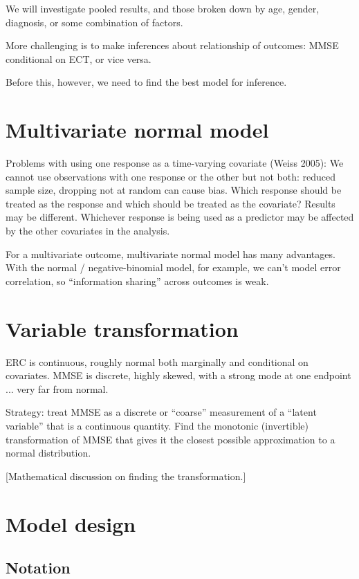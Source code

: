 \documentclass[12pt]{article}
\begin{document}
We will investigate pooled results, and those broken down by age, gender, diagnosis, or some combination of factors. 

More challenging is to make inferences about relationship of outcomes: MMSE conditional on ECT, or vice versa. 

Before this, however, we need to find the best model for inference.

\section{Multivariate normal model}

Problems with using one response as a time-varying covariate (Weiss 2005): We cannot use observations with one response or the other but not both: reduced sample size, dropping not at random can cause bias. Which response should be treated as the response and which should be treated as the covariate? Results may be different. Whichever response is being used as a predictor may be affected by the other covariates in the analysis. 

For a multivariate outcome, multivariate normal model has many advantages. With the normal / negative-binomial model, for example, we can’t model error correlation, so “information sharing” across outcomes is weak. 

\section{Variable transformation} 

ERC is continuous, roughly normal both marginally and conditional on covariates. MMSE is discrete, highly skewed, with a strong mode at one endpoint ... very far from normal. 

Strategy: treat MMSE as a discrete or “coarse” measurement of a “latent variable” that is a continuous quantity. Find the monotonic (invertible) transformation of MMSE that gives it the closest possible approximation to a normal distribution. 

[Mathematical discussion on finding the transformation.]

\section{Model design}

\subsection{Notation}
\end{document}
